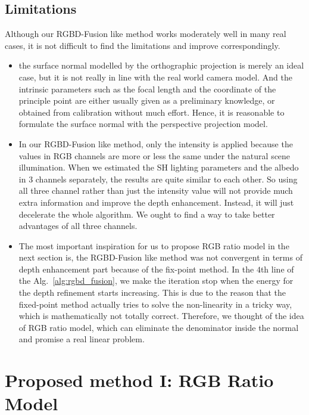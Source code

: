 \subsection{Limitations}

Although our RGBD-Fusion like method works moderately well in many real cases, it is not difficult to find the limitations and improve correspondingly.
\begin{itemize}
\item the surface normal modelled by the orthographic projection is merely an ideal case, but it is not really in line with the real world camera model.
And the intrinsic parameters such as the focal length and the coordinate of the principle point are either usually given as a preliminary knowledge, or obtained from calibration without much effort.
Hence, it is reasonable to formulate the surface normal with the perspective projection model.

\item In our RGBD-Fusion like method, only the intensity is applied because the values in RGB channels are more or less the same under the natural scene illumination. 
When we estimated the SH lighting parameters and the albedo in 3 channels separately, the results are quite similar to each other.
So using all three channel rather than just the intensity value will not provide much extra information and improve the depth enhancement. 
Instead, it will just decelerate the whole algorithm.
We ought to find a way to take better advantages of all three channels.

\item The most important inspiration for us to propose RGB ratio model in the next section is, the RGBD-Fusion like method was not convergent in terms of depth enhancement part because of the fix-point method.
In the $4$th line of the Alg.~\ref{alg:rgbd_fusion}, we make the iteration stop when the energy for the depth refinement starts increasing.
This is due to the reason that the fixed-point method actually tries to solve the non-linearity in a tricky way, which is mathematically not totally correct. 
Therefore, we thought of the idea of RGB ratio model, which can eliminate the denominator inside the normal and promise a real linear problem.

\end{itemize}


\section{Proposed method I: RGB Ratio Model}

